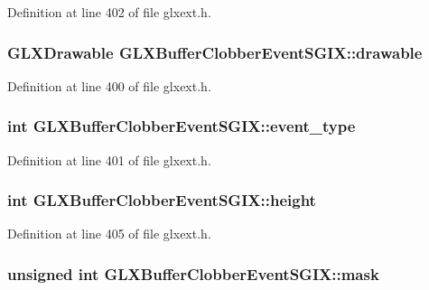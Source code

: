 Definition at line 402 of file glxext.h.

\hypertarget{struct_g_l_x_buffer_clobber_event_s_g_i_x_a9c45674193ed80a79261c3b7518ee04f}{
\subsubsection[{drawable}]{\setlength{\rightskip}{0pt plus 5cm}GLXDrawable {\bf GLXBufferClobberEventSGIX::drawable}}}
\label{struct_g_l_x_buffer_clobber_event_s_g_i_x_a9c45674193ed80a79261c3b7518ee04f}


Definition at line 400 of file glxext.h.

\hypertarget{struct_g_l_x_buffer_clobber_event_s_g_i_x_a0b405123f1d6528f1f4dfa7ff92bde9b}{
\subsubsection[{event\_\-type}]{\setlength{\rightskip}{0pt plus 5cm}int {\bf GLXBufferClobberEventSGIX::event\_\-type}}}
\label{struct_g_l_x_buffer_clobber_event_s_g_i_x_a0b405123f1d6528f1f4dfa7ff92bde9b}


Definition at line 401 of file glxext.h.

\hypertarget{struct_g_l_x_buffer_clobber_event_s_g_i_x_a7838dbabb76c22aa8241310a3f2363ea}{
\subsubsection[{height}]{\setlength{\rightskip}{0pt plus 5cm}int {\bf GLXBufferClobberEventSGIX::height}}}
\label{struct_g_l_x_buffer_clobber_event_s_g_i_x_a7838dbabb76c22aa8241310a3f2363ea}


Definition at line 405 of file glxext.h.

\hypertarget{struct_g_l_x_buffer_clobber_event_s_g_i_x_a74b4ad1ad3cac011001151411f621da1}{
\subsubsection[{mask}]{\setlength{\rightskip}{0pt plus 5cm}unsigned int {\bf GLXBufferClobberEventSGIX::mask}}}
\label{struct_g_l_x_buffer_clobber_event_s_g_i_x_a74b4ad1ad3cac011001151411f621da1}



